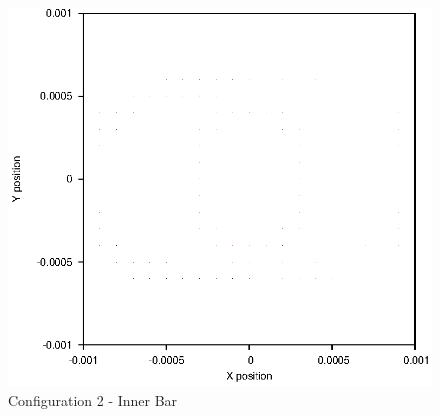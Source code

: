 \documentclass[a4paper,12pt]{article}
\begin{document}
\begin{figure}[H]
\centering
\includegraphics[width=.9\textwidth]{./results/002-5-001/Inner.eps}
\caption{Configuration 2 - Inner Bar}
\label{fig:config2i}
\end{figure}
\end{document}
